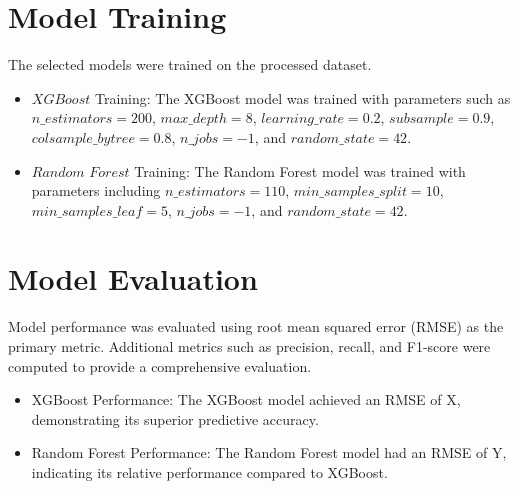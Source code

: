 \documentclass{article}
\begin{document}
\section{Model Training}
The selected models were trained on the processed dataset.

\begin{itemize}
    \item $XGBoost$ Training: The XGBoost model was trained with parameters such as $n\_estimators=200$, $max\_depth=8$, $learning\_rate=0.2$, $subsample=0.9$, $colsample\_bytree=0.8$, $n\_jobs=-1$, and $random\_state=42$.
    \item $Random$ $Forest$ Training: The Random Forest model was trained with parameters including $n\_estimators=110$, $min\_samples\_split=10$, $min\_samples\_leaf=5$, $n\_jobs=-1$, and $random\_state=42$.
\end{itemize}

\section{Model Evaluation}
Model performance was evaluated using root mean squared error (RMSE) as the primary metric. Additional metrics such as precision, recall, and F1-score were computed to provide a comprehensive evaluation.
\begin{itemize}
    \item XGBoost Performance: The XGBoost model achieved an RMSE of X, demonstrating its superior predictive accuracy.
    \item Random Forest Performance: The Random Forest model had an RMSE of Y, indicating its relative performance compared to XGBoost.
\end{itemize}
\end{document}
